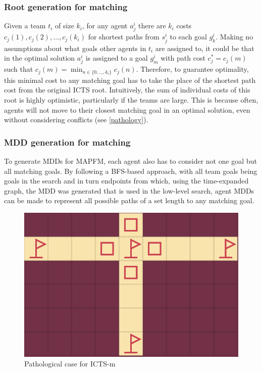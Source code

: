 \documentclass[english,10pt]{article}
\begin{document}
	\subsubsection{Root generation for matching}
	Given a team $t_i$ of size $k_i$, for any agent $a_j^i$ there are $k_i$ costs $c_j(1),c_j(2),\ldots,c_j(k_i)$ for shortest paths from $s_j^i$ to each goal $g_k^i$. Making no assumptions about what goals other agents in $t_i$ are assigned to, it could be that in the optimal solution $a_j^i$ is assigned to a goal $g_{m}^i$ with path cost $c^*_j = c_j(m)$ such that $c_j(m) = \min_{n\in\{0,\ldots,k_i\}} c_j(n)$. Therefore, to guarantee optimality, this minimal cost to any matching goal has to take the place of the shortest path cost from the original ICTS root. Intuitively, the sum of individual costs of this root is highly optimistic, particularly if the teams are large. This is because often, agents will not move to their closest matching goal in an optimal solution, even without considering conflicts (see \ref{pathology}).
	
	\subsubsection{MDD generation for matching}
	To generate MDDs for MAPFM, each agent also has to consider not one goal but all matching goals. By following a BFS-based approach, with all team goals being goals in the search and in turn endpoints from which, using the time-expanded graph, the MDD was generated that is used in the low-level search, agent MDDs can be made to represent all possible paths of a set length to any matching goal.
	\begin{figure}
		\centering
		\includegraphics[width=\linewidth]{img/path}
		\caption{Pathological case for ICTS-m}
		\label{fig:path}
	\end{figure}
\end{document}
